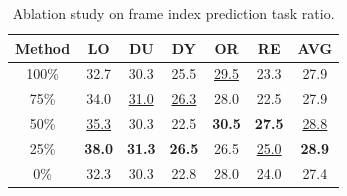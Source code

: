 \begin{table}[t]
\centering


\begin{tabular}{ccccccc}
\toprule
Method  & LO & DU & DY & OR & RE & AVG  \\
\midrule
100\% & 32.7 & 30.3 & 25.5 & \underline{29.5} & 23.3 & 27.9 \\
75\%  & 34.0 & \underline{31.0} & \underline{26.3} & 28.0 & 22.5 & 27.9 \\
50\%  & \underline{35.3} & 30.3 & 22.5 & \textbf{30.5} & \textbf{27.5} & \underline{28.8} \\
25\%  & \textbf{38.0} & \textbf{31.3} & \textbf{26.5} & 26.5 & \underline{25.0} & \textbf{28.9} \\
0\% & 32.3 & 30.3 & 22.8 & 28.0 & 24.0 & 27.4 \\
\bottomrule
\end{tabular}

\caption{Ablation study on frame index prediction task ratio.}
\label{tab:frame}
\end{table}